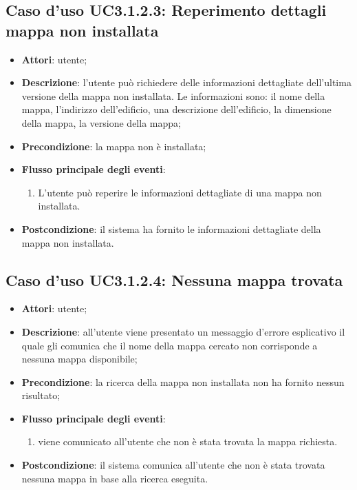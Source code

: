 \documentclass[../AnalisiDeiRequisiti.tex]{subfiles}
\begin{document}
\subsection{Caso d'uso UC3.1.2.3: Reperimento dettagli mappa non installata}
\begin{itemize}
	\item \textbf{Attori}: utente;
	\item \textbf{Descrizione}: l'utente può richiedere delle informazioni dettagliate dell'ultima versione della mappa non installata. Le informazioni sono: il nome della mappa, l'indirizzo dell'edificio, una descrizione dell'edificio, la dimensione della mappa, la versione della mappa; 
	\item \textbf{Precondizione}: la mappa non è installata;
	
	\item \textbf{Flusso principale degli eventi}:
	\begin{enumerate}
		\item L'utente può reperire le informazioni dettagliate di una mappa non installata.
		
	\end{enumerate}
	\item \textbf{Postcondizione}: il sistema ha fornito le informazioni dettagliate della mappa non installata.
\end{itemize}
\hypertarget{UC3.1.2.4}{}
\subsection{Caso d'uso UC3.1.2.4: Nessuna mappa trovata}
\begin{itemize}
	\item \textbf{Attori}: utente;
	\item \textbf{Descrizione}: all'utente viene presentato un messaggio d'errore esplicativo il quale gli comunica che il nome della mappa cercato non corrisponde a nessuna mappa disponibile; 
	\item \textbf{Precondizione}: la ricerca della mappa non installata non ha fornito nessun risultato;
	
	\item \textbf{Flusso principale degli eventi}:
	\begin{enumerate}
		\item viene comunicato all'utente che non è stata trovata la mappa richiesta.
		
	\end{enumerate}
	\item \textbf{Postcondizione}: il sistema comunica all'utente che non è stata trovata nessuna mappa in base alla ricerca eseguita.
\end{itemize}
\hypertarget{UC3.2}{}
\end{document}
